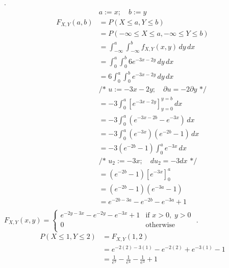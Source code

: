 \documentclass[12pt,border=4pt,multi]{article} %
\begin{document}
\newpage
{}.
\begin{align*}
&a := x; \quad b := y\\
F_{X, Y}(a, b) &= P(X \leq a, Y \leq b)\\
&= P(-\infty \leq X \leq a, -\infty \leq Y \leq b)\\
&= \int_{-\infty}^{a} \int_{-\infty}^{b} f_{X, Y}(x, y)\,dy\,dx\\
&= \int_{0}^{a} \int_{0}^{b} 6e^{-3x - 2y}\,dy\,dx\\
&= 6\int_{0}^{a} \int_{0}^{b} e^{-3x - 2y}\,dy\,dx\\
&\text{/* } u := -3x - 2y;\quad \partial u = -2 \partial y \text{ */}\\
&= -3\int_{0}^{a} [e^{-3x - 2y}]_{y = 0}^{y = b}\,dx\\ 
&= -3\int_{0}^{a} (e^{-3x - 2b} - e^{-3x})\,dx\\ 
&= -3\int_{0}^{a} (e^{-3x})(e^{-2b} - 1)\,dx\\
&= -3(e^{-2b} - 1)\int_{0}^{a} e^{-3x}\,dx\\
&\text{/* } u_2 := -3x;\quad du_2 = -3dx \text{ */}\\
&= (e^{-2b} - 1) [e^{-3x}]_0^a\\
&= (e^{-2b} - 1)(e^{-3a} - 1)\\
&= e^{-2b - 3a} - e^{-2b} - e^{-3a} + 1\\
\end{align*}
$\boxed{F_{X, Y}(x, y) =
\begin{cases}
e^{-2y - 3x} - e^{-2y} - e^{-3x} + 1 & \text{if } x > 0,\; y > 0\\
0 & \text{otherwise}\\
\end{cases}}$
\newpage
{}.
\begin{align*}
P(X \leq 1, Y \leq 2) &= F_{X, Y}(1, 2)\\
&= e^{-2(2) - 3(1)} - e^{-2(2)} + e^{-3(1)} - 1\\
&= \boxed{\frac{1}{e^{7}} - \frac{1}{e^{4}} - \frac{1}{e^{3}} + 1}\\
\end{align*}
\end{document}
